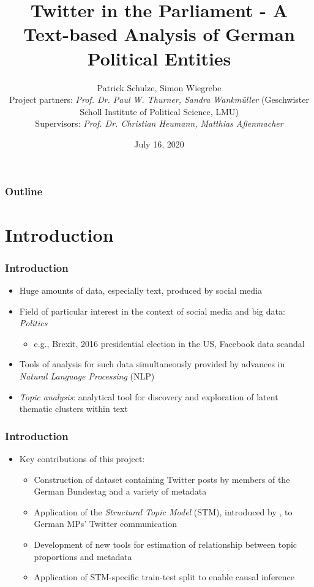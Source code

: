 \documentclass[xcolor=dvipsnames]{beamer}
\title{Twitter in the Parliament - A Text-based Analysis of German Political Entities}
\date{July 16, 2020}
\author[author1]{Patrick Schulze, Simon Wiegrebe\\[5mm]{\tiny
Project partners: \textit{Prof. Dr. Paul W. Thurner, Sandra Wankmüller} (Geschwister Scholl Institute of Political Science, LMU) \\[2mm]
Supervisors: \textit{Prof. Dr. Christian Heumann, Matthias Aßenmacher}
}}
\begin{document}
\begin{frame}
\titlepage
\end{frame}

\begin{frame}
\frametitle{Outline}
\tableofcontents[]
\end{frame}

\section{Introduction}
\begin{frame}
\frametitle{Introduction}
\begin{itemize}
\item Huge amounts of data, especially text, produced by social media
\item Field of particular interest in the context of social media and big data: \textit{Politics}
	\begin{itemize}
	\item e.g., Brexit, 2016 presidential election in the US, Facebook data scandal
	\end{itemize}		
\item Tools of analysis for such data simultaneously provided by advances in \textit{Natural Language Processing} (NLP)
\item \textit{Topic analysis}: analytical tool for discovery and exploration of latent thematic clusters within text 
\end{itemize}
\end{frame}

\begin{frame}
\frametitle{Introduction}
\begin{itemize}
\item Key contributions of this project:
	\begin{itemize}
	\item Construction of dataset containing Twitter posts by members of the German Bundestag and a variety of metadata
	\item Application of the \textit{Structural Topic Model} (STM), introduced by \cite{roberts2016model}, to German MPs' Twitter communication
	\item Development of new tools for estimation of relationship between topic proportions and metadata
	\item Application of STM-specific train-test split to enable causal inference
	\end{itemize}
\end{itemize}
\end{frame}
\end{document}
